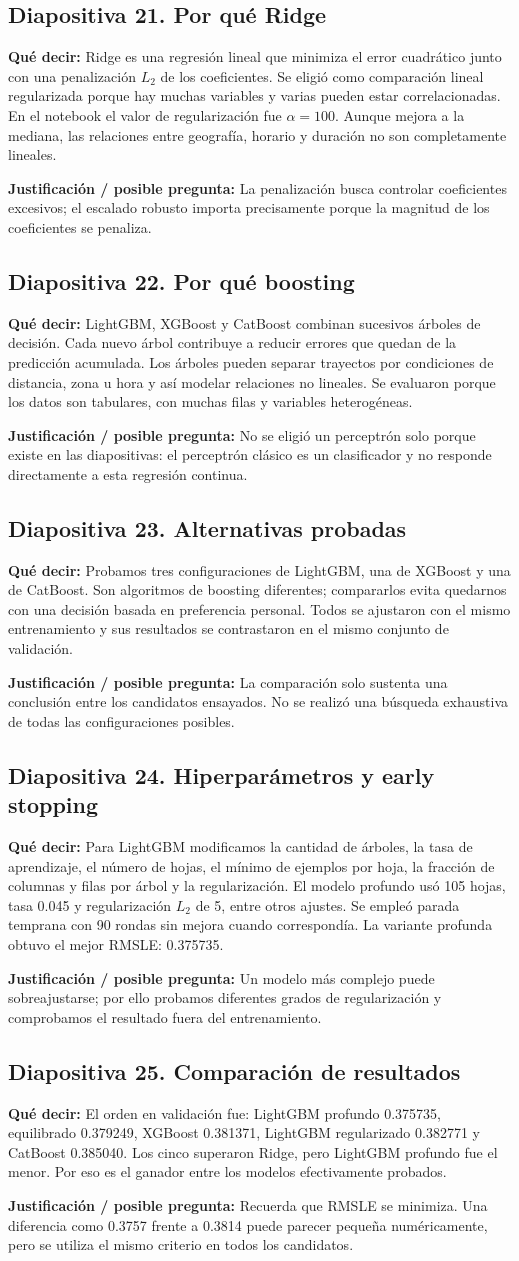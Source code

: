 \documentclass[11pt,letterpaper]{article}
\newcommand{\lamina}[2]{\subsection*{Diapositiva #1. #2}}
\newcommand{\explica}[1]{\noindent\textcolor{azul}{\textbf{Qué decir:}} #1\par\smallskip}
\newcommand{\defiende}[1]{\noindent\textcolor{verde}{\textbf{Justificación / posible pregunta:}} #1\par\medskip}
\begin{document}
\lamina{21}{Por qué Ridge}
\explica{Ridge es una regresión lineal que minimiza el error cuadrático junto con una penalización $L_2$ de los coeficientes. Se eligió como comparación lineal regularizada porque hay muchas variables y varias pueden estar correlacionadas. En el notebook el valor de regularización fue $\alpha=100$. Aunque mejora a la mediana, las relaciones entre geografía, horario y duración no son completamente lineales.}
\defiende{La penalización busca controlar coeficientes excesivos; el escalado robusto importa precisamente porque la magnitud de los coeficientes se penaliza.}

\lamina{22}{Por qué boosting}
\explica{LightGBM, XGBoost y CatBoost combinan sucesivos árboles de decisión. Cada nuevo árbol contribuye a reducir errores que quedan de la predicción acumulada. Los árboles pueden separar trayectos por condiciones de distancia, zona u hora y así modelar relaciones no lineales. Se evaluaron porque los datos son tabulares, con muchas filas y variables heterogéneas.}
\defiende{No se eligió un perceptrón solo porque existe en las diapositivas: el perceptrón clásico es un clasificador y no responde directamente a esta regresión continua.}

\lamina{23}{Alternativas probadas}
\explica{Probamos tres configuraciones de LightGBM, una de XGBoost y una de CatBoost. Son algoritmos de boosting diferentes; compararlos evita quedarnos con una decisión basada en preferencia personal. Todos se ajustaron con el mismo entrenamiento y sus resultados se contrastaron en el mismo conjunto de validación.}
\defiende{La comparación solo sustenta una conclusión entre los candidatos ensayados. No se realizó una búsqueda exhaustiva de todas las configuraciones posibles.}

\lamina{24}{Hiperparámetros y early stopping}
\explica{Para LightGBM modificamos la cantidad de árboles, la tasa de aprendizaje, el número de hojas, el mínimo de ejemplos por hoja, la fracción de columnas y filas por árbol y la regularización. El modelo profundo usó 105 hojas, tasa 0.045 y regularización $L_2$ de 5, entre otros ajustes. Se empleó parada temprana con 90 rondas sin mejora cuando correspondía. La variante profunda obtuvo el mejor RMSLE: 0.375735.}
\defiende{Un modelo más complejo puede sobreajustarse; por ello probamos diferentes grados de regularización y comprobamos el resultado fuera del entrenamiento.}

\lamina{25}{Comparación de resultados}
\explica{El orden en validación fue: LightGBM profundo 0.375735, equilibrado 0.379249, XGBoost 0.381371, LightGBM regularizado 0.382771 y CatBoost 0.385040. Los cinco superaron Ridge, pero LightGBM profundo fue el menor. Por eso es el ganador entre los modelos efectivamente probados.}
\defiende{Recuerda que RMSLE se minimiza. Una diferencia como 0.3757 frente a 0.3814 puede parecer pequeña numéricamente, pero se utiliza el mismo criterio en todos los candidatos.}
\end{document}
